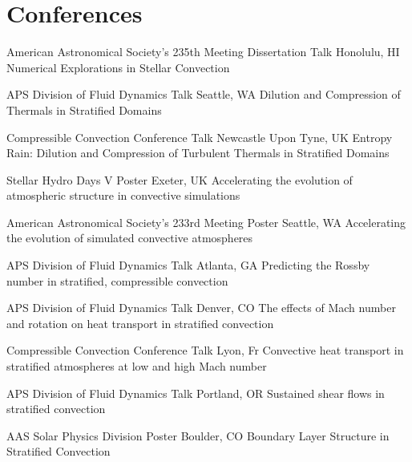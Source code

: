 \section{Conferences}

		{American Astronomical Society's 235th Meeting}
		{Dissertation Talk}
		{Honolulu, HI}
		{}
		{Numerical Explorations in Stellar Convection}

		{APS Division of Fluid Dynamics}
		{Talk}
		{Seattle, WA}
		{}
		{Dilution and Compression of Thermals in Stratified Domains}

\cventry{}
		{Compressible Convection Conference}
		{Talk}
		{Newcastle Upon Tyne, UK}
		{}
		{Entropy Rain: Dilution and Compression of Turbulent Thermals in Stratified Domains}

\cventry{}
		{Stellar Hydro Days V}
		{Poster}
		{Exeter, UK}
		{}
		{Accelerating the evolution of atmospheric structure in convective simulations}

\cventry{}
		{American Astronomical Society's 233rd Meeting}
		{Poster}
		{Seattle, WA}
		{}
		{Accelerating the evolution of simulated convective atmospheres}

		{APS Division of Fluid Dynamics}
		{Talk}
		{Atlanta, GA}
		{}
		{Predicting the Rossby number in stratified, compressible convection}

		{APS Division of Fluid Dynamics}
		{Talk}
		{Denver, CO}
		{}
		{The effects of Mach number and rotation on heat transport in stratified convection}

\cventry{}
		{Compressible Convection Conference}
		{Talk}
		{Lyon, Fr}
		{}
		{Convective heat transport in stratified atmospheres at low and high Mach number}

		{APS Division of Fluid Dynamics}
		{Talk}
		{Portland, OR}
		{}
		{Sustained shear flows in stratified convection}

\cventry{}
		{AAS Solar Physics Division}
		{Poster}
		{Boulder, CO}
		{}
		{Boundary Layer Structure in Stratified Convection}

